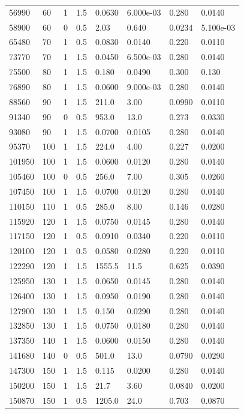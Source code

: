 \documentclass[preview]{standalone}
\begin{document}
{{\begin{tabular}{L{1.2cm}C{1.2cm} C{0.3cm}C{0.5cm} C{1.4cm}C{1.4cm} C{1.4cm}C{1.4cm}}
  56990  &    60  & 1     & 1.5 &  0.0630  & 6.000e-03  & 0.280 &  0.0140   \\ 
  58900  &    60  & 0     & 0.5 &  2.03  & 0.640  & 0.0234 &  5.100e-03   \\ 
  65480  &    70  & 1     & 0.5 &  0.0830  & 0.0140  & 0.220 &  0.0110   \\ 
  73770  &    70  & 1     & 1.5 &  0.0450  & 6.500e-03  & 0.280 &  0.0140   \\ 
  75500  &    80  & 1     & 1.5 &  0.180  & 0.0490  & 0.300 &  0.130   \\ 
  76890  &    80  & 1     & 1.5 &  0.0600  & 9.000e-03  & 0.280 &  0.0140   \\ 
  88560  &    90  & 1     & 1.5 &  211.0  & 3.00  & 0.0990 &  0.0110   \\ 
  91340  &    90  & 0     & 0.5 &  953.0  & 13.0  & 0.273 &  0.0330   \\ 
  93080  &    90  & 1     & 1.5 &  0.0700  & 0.0105  & 0.280 &  0.0140   \\ 
  95370  &   100  & 1     & 1.5 &  224.0  & 4.00  & 0.227 &  0.0200   \\ 
  101950  &   100  & 1     & 1.5 &  0.0600  & 0.0120  & 0.280 &  0.0140   \\ 
  105460  &   100  & 0     & 0.5 &  256.0  & 7.00  & 0.305 &  0.0260   \\ 
  107450  &   100  & 1     & 1.5 &  0.0700  & 0.0120  & 0.280 &  0.0140   \\ 
  110150  &   110  & 1     & 0.5 &  285.0  & 8.00  & 0.146 &  0.0280   \\ 
  115920  &   120  & 1     & 1.5 &  0.0750  & 0.0145  & 0.280 &  0.0140   \\ 
  117150  &   120  & 1     & 0.5 &  0.0910  & 0.0340  & 0.220 &  0.0110   \\ 
  120100  &   120  & 1     & 0.5 &  0.0580  & 0.0280  & 0.220 &  0.0110   \\ 
  122290  &   120  & 1     & 1.5 &  1555.5  & 11.5  & 0.625 &  0.0390   \\ 
  125950  &   130  & 1     & 1.5 &  0.0650  & 0.0145  & 0.280 &  0.0140   \\ 
  126400  &   130  & 1     & 1.5 &  0.0950  & 0.0190  & 0.280 &  0.0140   \\ 
  127900  &   130  & 1     & 1.5 &  0.150  & 0.0290  & 0.280 &  0.0140   \\ 
  132850  &   130  & 1     & 1.5 &  0.0750  & 0.0180  & 0.280 &  0.0140   \\ 
  137350  &   140  & 1     & 1.5 &  0.0600  & 0.0150  & 0.280 &  0.0140   \\ 
  141680  &   140  & 0     & 0.5 &  501.0  & 13.0  & 0.0790 &  0.0290   \\ 
  147300  &   150  & 1     & 1.5 &  0.115  & 0.0200  & 0.280 &  0.0140   \\ 
  150200  &   150  & 1     & 1.5 &  21.7  & 3.60  & 0.0840 &  0.0200   \\ 
  150870  &   150  & 1     & 0.5 &  1205.0  & 24.0  & 0.703 &  0.0870   \\ 
\hline 
\end{tabular} 

}}
\end{document}
